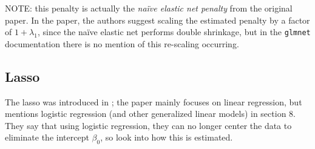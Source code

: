 \documentclass[10pt]{article}
\begin{document}
NOTE: this penalty is actually the \textit{na\"{i}ve elastic net penalty} from the original paper. In the paper, the authors suggest scaling the estimated penalty by a factor of $1 + \lambda_1$, since the na\"{i}ve elastic net performs double shrinkage, but in the \texttt{glmnet} documentation there is no mention of this re-scaling occurring.

\vspace{0.5pt}

\subsection{Lasso}


The lasso was introduced in \cite{tibshirani1996regression}; the paper mainly focuses on linear regression, but mentions logistic regression (and other generalized linear models) in section 8. They say that using logistic regression, they can no longer center the data to eliminate the intercept $\beta_0$, so look into how this is estimated. 
\end{document}
